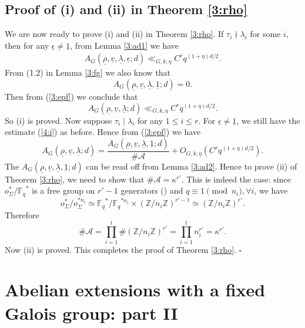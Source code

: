 \documentclass[12pt]{amsart}
\theoremstyle{plain}
\begin{document}
\subsection{Proof of (i) and (ii) in Theorem \ref{3:rho}}
We are now ready to prove (i) and (ii) in Theorem \ref{3:rho}. If $\tau_i \nmid \lambda_i$ for some $i$, then for any ${\underline{{\epsilon}}} \ne {\underline{{1}}}$, from Lemma \ref{3:ad1} we have
\begin{eqnarray} \label{4:i} {A_{G}({\underline{{\rho}}},{\underline{{v}}},{\underline{{\lambda}}},{\underline{{\epsilon}}};d)} \ll_{G,k,\eta} C^{r} q^{(1+\eta)d/2}. \end{eqnarray}
From (1.2) in Lemma \ref{3:fg} we also know that
\[{A_{G}({\underline{{\rho}}},{\underline{{v}}},{\underline{{\lambda}}},{\underline{{1}}};d)} =0. \]
Then from (\ref{3:epf}) we conclude that
\[{A_{G}({\underline{{\rho}}},{\underline{{v}}},{\underline{{\lambda}}};d)} \ll_{G,k,\eta} C^{r} q^{(1+\eta)d/2}. \]
So (i) is proved. Now suppose $\tau_i \mid \lambda_i$ for any $1 \le i \le r$. For ${\underline{{\epsilon}}} \ne {\underline{{1}}}$, we still have the estimate (\ref{4:i}) as before. Hence from (\ref{3:epf}) we have
\[{A_{G}({\underline{{\rho}}},{\underline{{v}}},{\underline{{\lambda}}};d)}=\frac{A_{G}({\underline{{\rho}}},{\underline{{v}}},{\underline{{\lambda}}},{\underline{{1}}};d)}{\#{\mathcal{A}}} +O_{G,k,\eta}\left(C^{r} q^{(1+\eta)d/2}\right).
\]
The ${A_{G}({\underline{{\rho}}},{\underline{{v}}},{\underline{{\lambda}}},{\underline{{1}}};d)}$ can be read off from Lemma \ref{3:ad2}. Hence to prove (ii) of Theorem \ref{3:rho}, we need to show that $\#{\mathcal{A}}=\kappa^{r'}$. This is indeed the case: since $o_{\Sigma}^*/{{\mathbb F}_q}^*$ is a free group on $r'-1$ generators (\cite[Proposition 14.2]{ros}) and $q \equiv 1 \pmod{n_i}, \forall i$, we have
\[o_{\Sigma}^*/o_{\Sigma}^{*n_i} \simeq {{\mathbb F}_q}^*/{{\mathbb F}_q}^{*n_i} \times \left({{\mathbb Z}}/n_i{{\mathbb Z}}\right)^{r'-1} \simeq \left({{\mathbb Z}}/n_i{{\mathbb Z}}\right)^{r'}. \]
Therefore
\[\#{\mathcal{A}}=\prod_{i=1}^t \#\left({{\mathbb Z}}/n_i{{\mathbb Z}}\right)^{r'}=\prod_{i=1}^t n_i^{r'}=\kappa^{r'}. \]
Now (ii) is proved. This completes the proof of Theorem \ref{3:rho}. \quad $\square$

\section{Abelian extensions with a fixed Galois group: part II}
\end{document}
